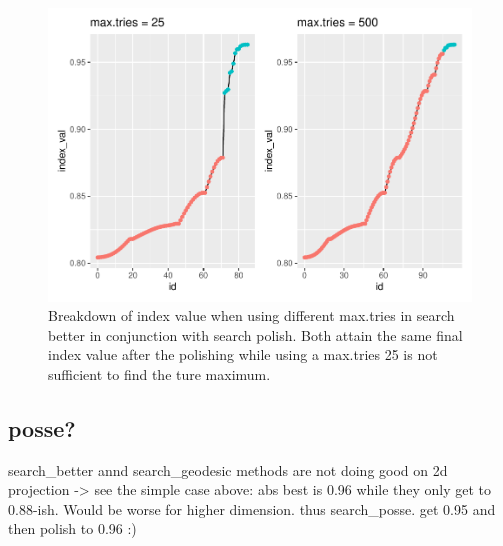 \documentclass[12pt]{article}
\begin{document}
\begin{figure}
\centering
\includegraphics{paper_files/figure-latex/trace-compare-1.pdf}
\caption{Breakdown of index value when using different max.tries in
search better in conjunction with search polish. Both attain the same
final index value after the polishing while using a max.tries 25 is not
sufficient to find the ture maximum.}
\end{figure}

\hypertarget{posse}{%
\subsection{posse?}\label{posse}}

search\_better annd search\_geodesic methods are not doing good on 2d
projection -\textgreater{} see the simple case above: abs best is 0.96
while they only get to 0.88-ish. Would be worse for higher dimension.
thus search\_posse. get 0.95 and then polish to 0.96 :)



\end{document}
